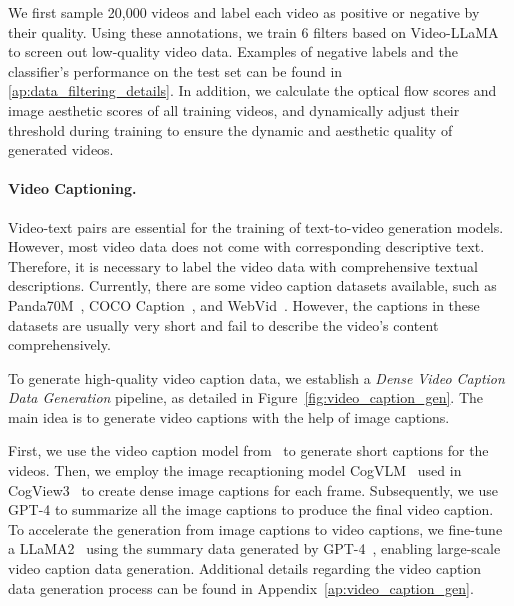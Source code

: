 We first sample 20,000 videos and label each video as positive or negative by their quality.
Using these annotations, we train 6 filters based on Video-LLaMA~\citep{zhang2023video} to screen out low-quality video data. Examples of negative labels and the classifier's performance on the test set can be found in \cref{ap:data_filtering_details}.
In addition, we calculate the optical flow scores and image aesthetic scores of all training videos, and dynamically adjust their threshold during training to ensure the dynamic and aesthetic quality of generated videos. 




\paragraph{Video Captioning.}
Video-text pairs are essential for the training of text-to-video generation models.
However, most video data does not come with corresponding descriptive text. Therefore, it is necessary to label the video data with comprehensive textual descriptions. 
Currently, there are some video caption datasets available, such as Panda70M~\citep{chen2024panda}, COCO Caption~\citep{lin2014microsoft}, and WebVid~\cite{bain2021frozen}. 
However, the captions in these datasets are usually very short and fail to describe the video's content comprehensively. 






To generate high-quality video caption data, we establish a \textit{Dense Video Caption Data Generation} 
pipeline, as detailed in Figure~\ref{fig:video_caption_gen}.  
The main idea is to generate video captions with the help of image captions. %

First, we use the video caption model from~\citet{chen2024panda} to generate short captions for the videos. 
Then, we employ the image recaptioning model CogVLM~\citep{wang2023cogvlm} used in CogView3~\citep{zheng2024cogview3} to create dense image captions for each frame.  
Subsequently, we use GPT-4 to summarize all the image captions to produce the final video caption. 
To accelerate the generation from image captions to video captions, we fine-tune a LLaMA2~\citep{touvron2023llama} using the summary data generated by GPT-4~\citep{GPT4}, enabling large-scale video caption data generation. Additional details regarding the video caption data generation process can be found in Appendix~\ref{ap:video_caption_gen}.


